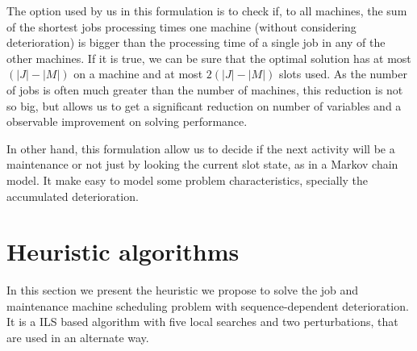 \documentclass[a4paper,11pt]{article}
\begin{document}
The option used by us in this formulation is to check if, to all machines, the sum of the shortest jobs processing times one machine (without considering deterioration) is bigger than the processing time of a single job in any of the other machines. If it is true, we can be sure that the optimal solution has at most $(|J| - |M|)$ on a machine and at most $2(|J| - |M|)$ slots used. As the number of jobs is often much greater than the number of machines, this reduction is not so big, but allows us to get a significant reduction on number of variables and a observable improvement on solving performance.  

In other hand, this formulation allow us to decide if the next activity will be a maintenance or not just by looking the current slot state, as in a Markov chain model. It make easy to model some problem characteristics, specially the accumulated deterioration. 

\section{Heuristic algorithms}

In this section we present the heuristic we propose to solve the job and maintenance machine scheduling problem with sequence-dependent deterioration. It is a ILS based algorithm with five local searches and two perturbations, that are used in an alternate way.  
\end{document}
